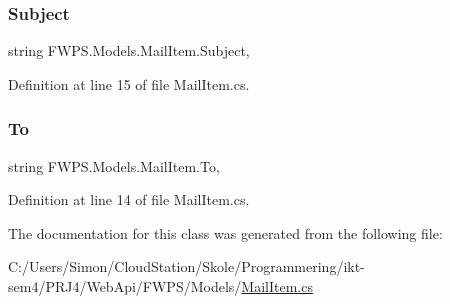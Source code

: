 \subsubsection{\texorpdfstring{Subject}{Subject}}
{\footnotesize\ttfamily string F\+W\+P\+S.\+Models.\+Mail\+Item.\+Subject\hspace{0.3cm}{\ttfamily [get]}, {\ttfamily [set]}}



Definition at line 15 of file Mail\+Item.\+cs.

\mbox{\label{class_f_w_p_s_1_1_models_1_1_mail_item_a16e6102afe35c63df63af9968930577a}} 
\subsubsection{\texorpdfstring{To}{To}}
{\footnotesize\ttfamily string F\+W\+P\+S.\+Models.\+Mail\+Item.\+To\hspace{0.3cm}{\ttfamily [get]}, {\ttfamily [set]}}



Definition at line 14 of file Mail\+Item.\+cs.



The documentation for this class was generated from the following file\+:\begin{DoxyCompactItemize}
\item 
C\+:/\+Users/\+Simon/\+Cloud\+Station/\+Skole/\+Programmering/ikt-\/sem4/\+P\+R\+J4/\+Web\+Api/\+F\+W\+P\+S/\+Models/\mbox{\hyperlink{_mail_item_8cs}{Mail\+Item.\+cs}}\end{DoxyCompactItemize}
